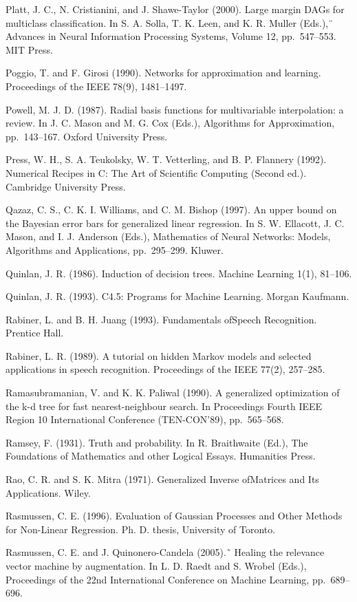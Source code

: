 \documentclass[
  10
]{article}
\begin{document}
Platt, J. C., N. Cristianini, and J. Shawe-Taylor (2000). Large margin
DAGs for multiclass classification. In S. A. Solla, T. K. Leen, and K.
R. Muller (Eds.),¨ Advances in Neural Information Processing Systems,
Volume 12, pp.~547--553. MIT Press.

Poggio, T. and F. Girosi (1990). Networks for approximation and
learning. Proceedings of the IEEE 78(9), 1481--1497.

Powell, M. J. D. (1987). Radial basis functions for multivariable
interpolation: a review. In J. C. Mason and M. G. Cox (Eds.), Algorithms
for Approximation, pp.~143--167. Oxford University Press.

Press, W. H., S. A. Teukolsky, W. T. Vetterling, and B. P. Flannery
(1992). Numerical Recipes in C: The Art of Scientific Computing (Second
ed.). Cambridge University Press.

Qazaz, C. S., C. K. I. Williams, and C. M. Bishop (1997). An upper bound
on the Bayesian error bars for generalized linear regression. In S. W.
Ellacott, J. C. Mason, and I. J. Anderson (Eds.), Mathematics of Neural
Networks: Models, Algorithms and Applications, pp.~295--299. Kluwer.

Quinlan, J. R. (1986). Induction of decision trees. Machine Learning
1(1), 81--106.

Quinlan, J. R. (1993). C4.5: Programs for Machine Learning. Morgan
Kaufmann.

Rabiner, L. and B. H. Juang (1993). Fundamentals ofSpeech Recognition.
Prentice Hall.

Rabiner, L. R. (1989). A tutorial on hidden Markov models and selected
applications in speech recognition. Proceedings of the IEEE 77(2),
257--285.

Ramasubramanian, V. and K. K. Paliwal (1990). A generalized optimization
of the k-d tree for fast nearest-neighbour search. In Proceedings Fourth
IEEE Region 10 International Conference (TEN-CON'89), pp.~565--568.

Ramsey, F. (1931). Truth and probability. In R. Braithwaite (Ed.), The
Foundations of Mathematics and other Logical Essays. Humanities Press.

Rao, C. R. and S. K. Mitra (1971). Generalized Inverse ofMatrices and
Its Applications. Wiley.

Rasmussen, C. E. (1996). Evaluation of Gaussian Processes and Other
Methods for Non-Linear Regression. Ph. D. thesis, University of Toronto.

Rasmussen, C. E. and J. Quinonero-Candela (2005).˜ Healing the relevance
vector machine by augmentation. In L. D. Raedt and S. Wrobel (Eds.),
Proceedings of the 22nd International Conference on Machine Learning,
pp.~689--696.
\end{document}
